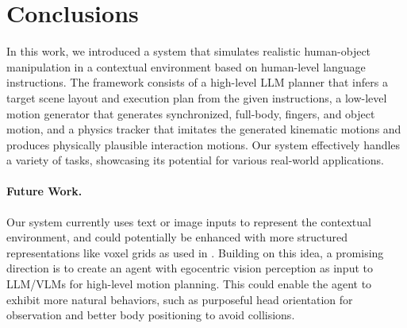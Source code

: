 \section{Conclusions}
In this work, we introduced a system that simulates realistic human-object manipulation in a contextual environment based on human-level language instructions.
The framework consists of a high-level LLM planner that infers a target scene layout and execution plan from the given instructions, a low-level motion generator that generates synchronized, full-body, fingers, and object motion, and a physics tracker that imitates the generated kinematic motions and produces physically plausible interaction motions.
Our system effectively handles a variety of tasks, showcasing its potential for various real-world applications.

\paragraph{Future Work.}
Our system currently uses text or image inputs to represent the contextual environment, and could potentially be enhanced with more structured representations like voxel grids as used in \cite{jiang2024autonomous}. 
Building on this idea, a promising direction is to create an agent with egocentric vision perception as input to LLM/VLMs for high-level motion planning. 
This could enable the agent to exhibit more natural behaviors, such as purposeful head orientation for observation and better body positioning to avoid collisions.


